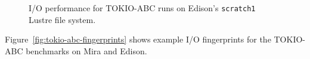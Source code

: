 \documentclass[conference,10pt,compsocconf]{IEEEtran}
\begin{document}
\begin{figure}[h]
\centering
\caption{I/O performance for TOKIO-ABC runs on Edison's \texttt{scratch1} Lustre file system.}
\label{fig:tokio-abc-perf-edison-scratch1}
\end{figure}

Figure~\ref{fig:tokio-abc-fingerprints} shows example I/O fingerprints for the TOKIO-ABC 
benchmarks on Mira and Edison.
\end{document}
